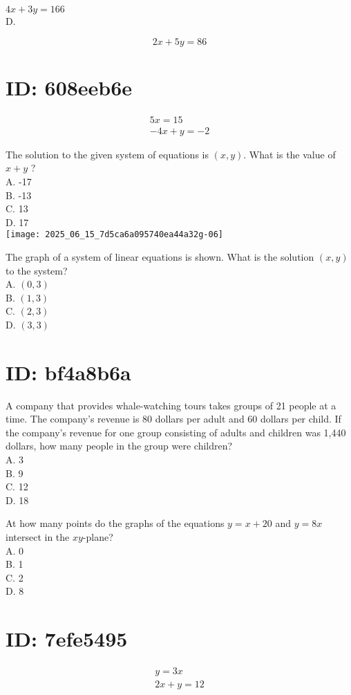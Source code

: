 $4 x+3 y=166$\\
D.

$$
2 x+5 y=86
$$

\section*{ID: 608eeb6e}
$$
\begin{gathered}
5 x=15 \\
-4 x+y=-2
\end{gathered}
$$

The solution to the given system of equations is $(x, y)$. What is the value of $x+y$ ?\\
A. -17\\
B. -13\\
C. 13\\
D. 17\\
\texttt{[image: 2025\_06\_15\_7d5ca6a095740ea44a32g-06]}

The graph of a system of linear equations is shown. What is the solution $(x, y)$ to the system?\\
A. $(0,3)$\\
B. $(1,3)$\\
C. $(2,3)$\\
D. $(3,3)$

\section*{ID: bf4a8b6a}
A company that provides whale-watching tours takes groups of 21 people at a time. The company's revenue is 80 dollars per adult and 60 dollars per child. If the company's revenue for one group consisting of adults and children was 1,440 dollars, how many people in the group were children?\\
A. 3\\
B. 9\\
C. 12\\
D. 18

At how many points do the graphs of the equations $y=x+20$ and $y=8 x$ intersect in the $x y$-plane?\\
A. 0\\
B. 1\\
C. 2\\
D. 8

\section*{ID: 7efe5495}
$$
\begin{gathered}
y=3 x \\
2 x+y=12
\end{gathered}
$$

